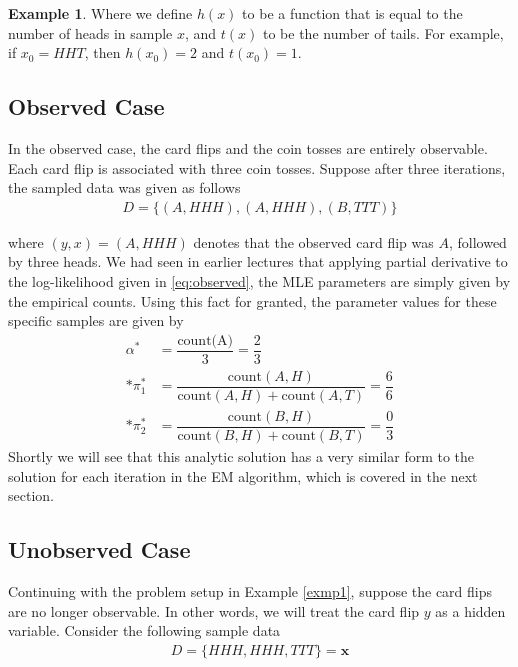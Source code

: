 \documentclass[justified, marginals=justified]{tufte-handout}
\theoremstyle{definition}
\newtheorem{exmp}{Example}
\begin{document}
\begin{exmp}
Where we define $h(x)$ to be a function that is equal to the number of heads in sample $x$, and $t(x)$ to be the number of tails. For example, if $x_0 = {HHT}$, then $h(x_0) = 2$ and $t(x_0) = 1$.  

\end{exmp}

\subsection{Observed Case}\label{sec:observed-case}
In the observed case, the card flips and the coin tosses are entirely observable. Each card flip is associated with three coin tosses. Suppose after three iterations, the sampled data was given as follows
\begin{align*}
D = \{(A, HHH), (A, HHH), (B, TTT)\}
\end{align*}

where $(y,x) = (A, HHH)$ denotes that the observed card flip was $A$, followed by three heads. We had seen in earlier lectures that applying partial derivative to the log-likelihood given in \eqref{eq:observed}, the MLE parameters are simply given by the empirical counts. Using this fact for granted, the parameter values for these specific samples are given by
\begin{align*}
\alpha^{*} &= \dfrac{\text{count(A)}}{3}=\dfrac{2}{3} \\*
\pi_1^{*} &= \dfrac{ \text{count}(A,H)} { \text{count}(A, H)+\text{count}(A, T) } = \dfrac{6}{6} \\*
\pi_2^{*} &= \dfrac{ \text{count}(B,H)} { \text{count}(B, H)+\text{count}(B, T) } = \dfrac{0}{3}
\end{align*}
Shortly we will see that this analytic solution has a very similar form to the solution for each iteration in the EM algorithm, which is covered in the next section. 

\subsection{Unobserved Case}\label{sec:unobserved-case}

Continuing with the problem setup in Example \ref{exmp1}, suppose the card flips are no longer observable. In other words, we will treat the card flip $y$ as a hidden variable. Consider the following sample data
\begin{align*}
D = \{HHH, HHH, TTT\} = \textbf{x}
\end{align*}
\end{document}
